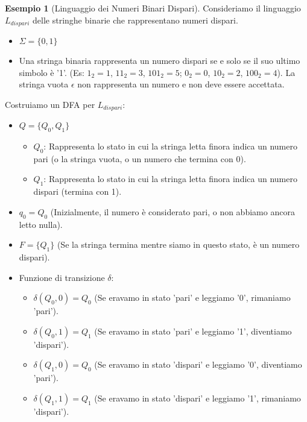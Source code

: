 \documentclass[a4paper]{article}
\theoremstyle{definition} %
\newtheorem{example}{Esempio}
\begin{document}
\begin{example}[Linguaggio dei Numeri Binari Dispari]
Consideriamo il linguaggio $L_{dispari}$ delle stringhe binarie che rappresentano numeri dispari.
\begin{itemize}
    \item $\Sigma = \{0, 1\}$
    \item Una stringa binaria rappresenta un numero dispari se e solo se il suo ultimo simbolo è '1'. (Es: $1_2=1$, $11_2=3$, $101_2=5$; $0_2=0$, $10_2=2$, $100_2=4$). La stringa vuota $\epsilon$ non rappresenta un numero e non deve essere accettata.
\end{itemize}

Costruiamo un DFA per $L_{dispari}$:
\begin{itemize}
    \item $Q = \{Q_0, Q_1\}$
        \begin{itemize}
            \item $Q_0$: Rappresenta lo stato in cui la stringa letta finora indica un numero pari (o la stringa vuota, o un numero che termina con 0).
            \item $Q_1$: Rappresenta lo stato in cui la stringa letta finora indica un numero dispari (termina con 1).
        \end{itemize}
    \item $q_0 = Q_0$ (Inizialmente, il numero è considerato pari, o non abbiamo ancora letto nulla).
    \item $F = \{Q_1\}$ (Se la stringa termina mentre siamo in questo stato, è un numero dispari).
    \item Funzione di transizione $\delta$:
        \begin{itemize}
            \item $\delta(Q_0, 0) = Q_0$ (Se eravamo in stato 'pari' e leggiamo '0', rimaniamo 'pari').
            \item $\delta(Q_0, 1) = Q_1$ (Se eravamo in stato 'pari' e leggiamo '1', diventiamo 'dispari').
            \item $\delta(Q_1, 0) = Q_0$ (Se eravamo in stato 'dispari' e leggiamo '0', diventiamo 'pari').
            \item $\delta(Q_1, 1) = Q_1$ (Se eravamo in stato 'dispari' e leggiamo '1', rimaniamo 'dispari').
        \end{itemize}
\end{itemize}

\begin{figure}[h!]
    \centering
\end{figure}
\end{example}
\end{document}
